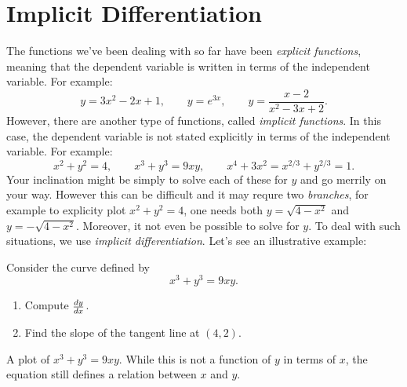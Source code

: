 \section{Implicit Differentiation}

The functions we've been dealing with so far have been
\textit{explicit functions}, meaning that the
dependent variable is written in terms of the independent variable. For
example:
\[
y=3x^2-2x+1,\qquad y=e^{3x}, \qquad y = \frac{x-2}{x^2-3x+2}.
\]
However, there are another type of functions, called \textit{implicit functions}. In this case, the dependent
variable is not stated explicitly in terms of the independent
variable. For example:
\[
x^2+y^2 = 4,\qquad x^3+y^3 = 9xy, \qquad x^4+3x^2 = x^{2/3}+y^{2/3} = 1.
\]
Your inclination might be simply to solve each of these for $y$ and go
merrily on your way. However this can be difficult and it may requre
two \textit{branches}, for example to explicity plot $x^2+y^2 = 4$,
one needs both $y= \sqrt{4-x^2}$ and $y=-\sqrt{4-x^2}$. Moreover, it not even be
possible to solve for $y$. To deal with such situations, we use
\textit{implicit differentiation}. Let's see an illustrative example:


\begin{example}
Consider the curve defined by
\[
x^3+y^3 = 9xy.
\]
\begin{enumerate}
\item Compute $\frac{dy}{dx}$.
\item Find the slope of the tangent line at $(4,2)$.
\end{enumerate}
\end{example}


\begin{marginfigure}
\caption{A plot of $x^3+y^3 = 9xy$. While this is not a function of
  $y$ in terms of $x$, the equation still defines a relation between
  $x$ and $y$.}
\end{marginfigure}

